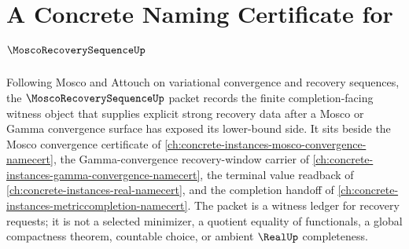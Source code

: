 \chapter{A Concrete Naming Certificate for $\MoscoRecoverySequenceUp$}
\label{ch:concrete-instances-mosco-recovery-sequence-namecert}

Following Mosco and Attouch on variational convergence and recovery sequences, the $\MoscoRecoverySequenceUp$ packet records the finite completion-facing witness object that supplies explicit strong recovery data after a Mosco or Gamma convergence surface has exposed its lower-bound side. It sits beside the Mosco convergence certificate of \autoref{ch:concrete-instances-mosco-convergence-namecert}, the Gamma-convergence recovery-window carrier of \autoref{ch:concrete-instances-gamma-convergence-namecert}, the terminal value readback of \autoref{ch:concrete-instances-real-namecert}, and the completion handoff of \autoref{ch:concrete-instances-metriccompletion-namecert}. The packet is a witness ledger for recovery requests; it is not a selected minimizer, a quotient equality of functionals, a global compactness theorem, countable choice, or ambient $\RealUp$ completeness.

